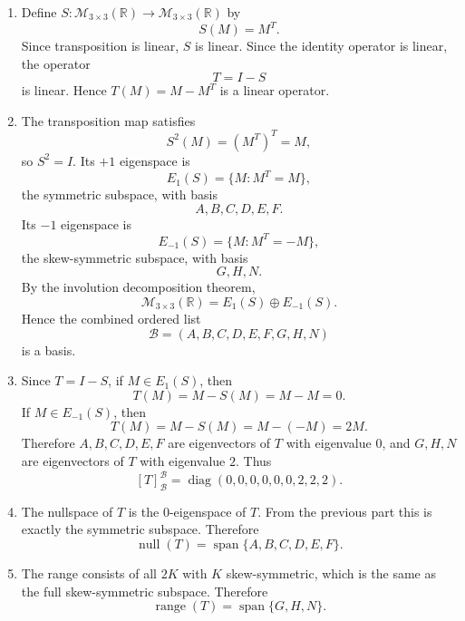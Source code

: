 \documentclass[12pt]{article}
\newcommand{\R}{\mathbb{R}}
\newcommand{\M}{\mathcal{M}}
\newcommand{\B}{\mathcal{B}}
\newcommand{\Null}{\operatorname{null}}
\newcommand{\Range}{\operatorname{range}}
\newcommand{\Span}{\operatorname{span}}
\newcommand{\diag}{\operatorname{diag}}
\begin{document}
\begin{enumerate}[label=(\alph*)]
  \item Define $S:\M_{3\times3}(\R)\to\M_{3\times3}(\R)$ by
  \[
  S(M)=M^T.
  \]
  Since transposition is linear, $S$ is linear. Since the identity operator is linear, the operator
  \[
  T=I-S
  \]
  is linear. Hence $T(M)=M-M^T$ is a linear operator.

  \item The transposition map satisfies
  \[
  S^2(M)=(M^T)^T=M,
  \]
  so $S^2=I$. Its $+1$ eigenspace is
  \[
  E_1(S)=\{M:M^T=M\},
  \]
  the symmetric subspace, with basis
  \[
  A,B,C,D,E,F.
  \]
  Its $-1$ eigenspace is
  \[
  E_{-1}(S)=\{M:M^T=-M\},
  \]
  the skew-symmetric subspace, with basis
  \[
  G,H,N.
  \]
  By the involution decomposition theorem,
  \[
  \M_{3\times3}(\R)=E_1(S)\oplus E_{-1}(S).
  \]
  Hence the combined ordered list
  \[
  \B=(A,B,C,D,E,F,G,H,N)
  \]
  is a basis.

  \item Since $T=I-S$, if $M\in E_1(S)$, then
  \[
  T(M)=M-S(M)=M-M=0.
  \]
  If $M\in E_{-1}(S)$, then
  \[
  T(M)=M-S(M)=M-(-M)=2M.
  \]
  Therefore $A,B,C,D,E,F$ are eigenvectors of $T$ with eigenvalue $0$, and $G,H,N$ are eigenvectors of $T$ with eigenvalue $2$. Thus
  \[
  \boxed{[T]_{\B}^{\B}=\diag(0,0,0,0,0,0,2,2,2).}
  \]

  \item The nullspace of $T$ is the $0$-eigenspace of $T$. From the previous part this is exactly the symmetric subspace. Therefore
  \[
  \boxed{\Null(T)=\Span\{A,B,C,D,E,F\}.}
  \]

  \item The range consists of all $2K$ with $K$ skew-symmetric, which is the same as the full skew-symmetric subspace. Therefore
  \[
  \boxed{\Range(T)=\Span\{G,H,N\}.}
  \]
\end{enumerate}

\bigskip
\end{document}
